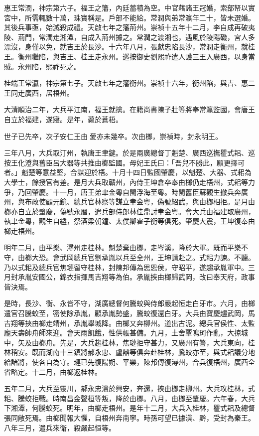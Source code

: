 惠王常潤，神宗第六子。福王之籓，內廷蓄積為空。中官藉諸王冠婚，索部帑以實宮中，所需輒數十萬，珠寶稱是。戶部不能給。常潤與弟常瀛年二十，皆未選婚。其後兵事亟，始滅殺成禮。天啟七年之籓荊州。崇禎十五年十二月，李自成再破夷陵、荊門，常潤走湘潭，自成入荊州據之。常潤之渡湘也，遇風於陵陽磯，宮人多漂沒，身僅以免，就吉王於長沙。十六年八月，張獻忠陷長沙，常潤走衡州，就桂王。衡州繼陷，與吉王、桂王走永州。巡按御史劉熙祚遣人護三王入廣西，以身當賊。永州陷，熙祚死之。

桂端王常瀛，神宗第七子。天啟七年之籓衡州。崇禎十六年，衡州陷，與吉、惠二王同走廣西，居梧州。

大清順治二年，大兵平江南，福王就擒。在籍尚書陳子壯等將奉常瀛監國，會唐王自立於福建，遂寢。是年，薨於蒼梧。

世子已先卒，次子安仁王由愛亦未幾卒。次由榔，崇禎時，封永明王。

三年八月，大兵取汀州，執唐王聿鍵。於是兩廣總督丁魁楚、廣西巡撫瞿式耜、巡按王化澄與舊臣呂大器等共推由榔監國。母妃王氏曰：「吾兒不勝此，願更擇可者。」魁楚等意益堅，合謀迎於梧。十月十四日監國肇慶，以魁楚、大器、式耜為大學士，餘授官有差。是月大兵取贛州，內侍王坤倉卒奉由榔仍走梧州，式耜等力爭，乃回肇慶。十一月，唐王弟聿金粵自閩浮海至粵。時閩舊臣蘇觀生撤兵奔廣州，與布政使顧元鏡、總兵官林察等謀立聿金粵，偽號紹武，與由榔相拒。是月由榔亦自立於肇慶，偽號永曆，遣兵部侍郎林佳鼎討聿金粵。會大兵由福建取廣州，執聿金粵，觀生自縊，祭酒梁朝鐘、太僕卿霍子衡等俱死。肇慶大震，王坤復奉由榔走梧州。

明年二月，由平樂、潯州走桂林。魁楚棄由榔，走岑溪，降於大軍。既而平樂不守，由榔大恐。會武岡總兵官劉承胤以兵至全州，王坤請赴之。式耜力諫。不聽。乃以式耜及總兵官焦璉留守桂林，封陳邦傳為思恩侯，守昭平，遂趨承胤軍中。三月封承胤安國公，錦衣指揮馬吉翔等為伯。承胤挾由榔歸武岡，改曰奉天府，政事皆決焉。

是時，長沙、衡、永皆不守，湖廣總督何騰蛟與侍郎嚴起恒走白牙市。六月，由榔遣官召騰蛟至，密使除承胤，顧承胤勢盛，騰蛟復還白牙。大兵由寶慶趨武岡，馬吉翔等挾由榔走靖州，承胤舉城降。由榔又奔柳州。道出古泥。總兵官侯性、太監龐天壽帥舟師來迎。會天雨飢餓，性供帳甚備。九月，土舍覃鳴珂作亂，大掠城中，矢及由榔舟。先是，大兵趨桂林，焦璉拒守甚力，又廣州有警，大兵東向，桂林稍安。既而湖南十三鎮將郝永忠、盧鼎等俱奔赴桂林，騰蛟亦至，與式耜議分地給諸將，使各自為守。璉已先復陽朔、平樂，陳邦傳復潯州，合兵復梧州，廣西全省略定。十二月，由榔返桂林。

五年二月，大兵至靈川，郝永忠潰於興安，奔還，挾由榔走柳州。大兵攻桂林，式耜、騰蛟拒戰。時南昌金聲桓等叛，降於由榔。八月，由榔至肇慶。六年春，大兵下湘潭，何騰蛟死。明年，由榔走梧州。是年十二月，大兵入桂林，瞿式耜及總督張同敞死焉。由榔聞報大懼，自梧州奔南寧。時孫可望已據滇、黔，受封為秦王。八年三月，遣兵來衛，殺嚴起恒等。

